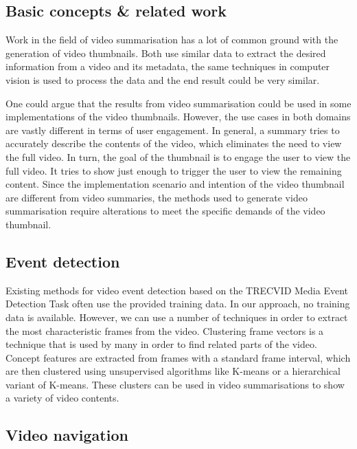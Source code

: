 \documentclass{../resources/sig-alternate-05-2015}
\begin{document}
\subsection{Basic concepts \& related work}


\label{related work}

Work in the field of video summarisation has a lot of common ground with the generation of video thumbnails. Both use similar data to extract the desired information from a video and its metadata, the same techniques in computer vision is used to process the data and the end result could be very similar. 

One could argue that the results from video summarisation could be used in some implementations of the video thumbnails. However, the use cases in both domains are vastly different in terms of user engagement. In general, a summary tries to accurately describe the contents of the video, which eliminates the need to view the full video. In turn, the goal of the thumbnail is to engage the user to view the full video. It tries to show just enough to trigger the user to view the remaining content. Since the implementation scenario and intention of the video thumbnail are different from video summaries, the methods used to generate video summarisation require alterations to meet the specific demands of the video thumbnail.

\subsection{Event detection}

Existing methods for video event detection based on the TRECVID Media Event Detection Task often use the provided training data. In our approach, no training data is available. However, we can use a number of techniques in order to extract the most characteristic frames from the video. Clustering frame vectors is a technique that is used by many in order to find related parts of the video. Concept features are extracted from frames with a standard frame interval, which are then clustered using unsupervised algorithms like K-means or a hierarchical variant of K-means. These clusters can be used in video summarisations to show a variety of video contents. 

\subsection{Video navigation}
\label{video navigation}
\end{document}
